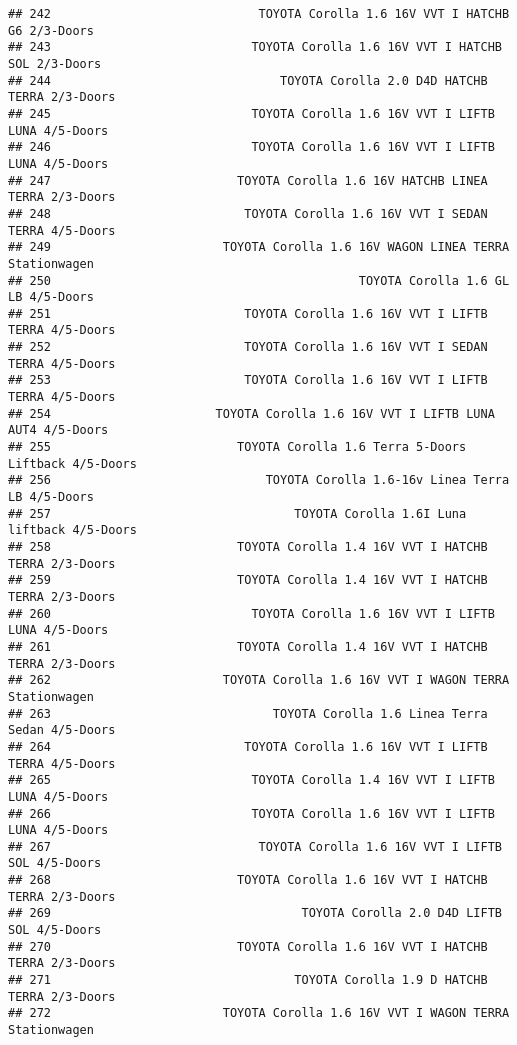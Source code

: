 \documentclass[]{article}
\begin{document}
\begin{verbatim}
## 242                             TOYOTA Corolla 1.6 16V VVT I HATCHB G6 2/3-Doors
## 243                            TOYOTA Corolla 1.6 16V VVT I HATCHB SOL 2/3-Doors
## 244                                TOYOTA Corolla 2.0 D4D HATCHB TERRA 2/3-Doors
## 245                            TOYOTA Corolla 1.6 16V VVT I LIFTB LUNA 4/5-Doors
## 246                            TOYOTA Corolla 1.6 16V VVT I LIFTB LUNA 4/5-Doors
## 247                          TOYOTA Corolla 1.6 16V HATCHB LINEA TERRA 2/3-Doors
## 248                           TOYOTA Corolla 1.6 16V VVT I SEDAN TERRA 4/5-Doors
## 249                        TOYOTA Corolla 1.6 16V WAGON LINEA TERRA Stationwagen
## 250                                           TOYOTA Corolla 1.6 GL LB 4/5-Doors
## 251                           TOYOTA Corolla 1.6 16V VVT I LIFTB TERRA 4/5-Doors
## 252                           TOYOTA Corolla 1.6 16V VVT I SEDAN TERRA 4/5-Doors
## 253                           TOYOTA Corolla 1.6 16V VVT I LIFTB TERRA 4/5-Doors
## 254                       TOYOTA Corolla 1.6 16V VVT I LIFTB LUNA AUT4 4/5-Doors
## 255                          TOYOTA Corolla 1.6 Terra 5-Doors Liftback 4/5-Doors
## 256                              TOYOTA Corolla 1.6-16v Linea Terra LB 4/5-Doors
## 257                                  TOYOTA Corolla 1.6I Luna liftback 4/5-Doors
## 258                          TOYOTA Corolla 1.4 16V VVT I HATCHB TERRA 2/3-Doors
## 259                          TOYOTA Corolla 1.4 16V VVT I HATCHB TERRA 2/3-Doors
## 260                            TOYOTA Corolla 1.6 16V VVT I LIFTB LUNA 4/5-Doors
## 261                          TOYOTA Corolla 1.4 16V VVT I HATCHB TERRA 2/3-Doors
## 262                        TOYOTA Corolla 1.6 16V VVT I WAGON TERRA Stationwagen
## 263                               TOYOTA Corolla 1.6 Linea Terra Sedan 4/5-Doors
## 264                           TOYOTA Corolla 1.6 16V VVT I LIFTB TERRA 4/5-Doors
## 265                            TOYOTA Corolla 1.4 16V VVT I LIFTB LUNA 4/5-Doors
## 266                            TOYOTA Corolla 1.6 16V VVT I LIFTB LUNA 4/5-Doors
## 267                             TOYOTA Corolla 1.6 16V VVT I LIFTB SOL 4/5-Doors
## 268                          TOYOTA Corolla 1.6 16V VVT I HATCHB TERRA 2/3-Doors
## 269                                   TOYOTA Corolla 2.0 D4D LIFTB SOL 4/5-Doors
## 270                          TOYOTA Corolla 1.6 16V VVT I HATCHB TERRA 2/3-Doors
## 271                                  TOYOTA Corolla 1.9 D HATCHB TERRA 2/3-Doors
## 272                        TOYOTA Corolla 1.6 16V VVT I WAGON TERRA Stationwagen

\end{verbatim}
\end{document}
